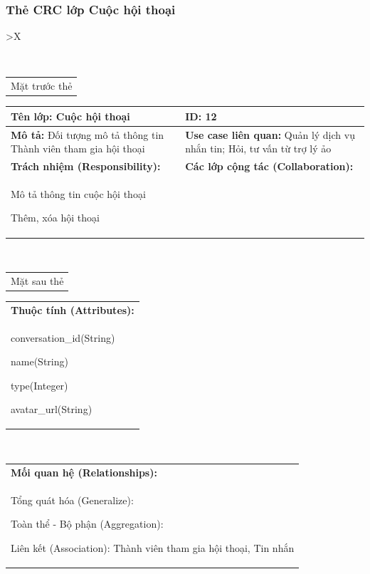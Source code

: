   \subsubsection{Thẻ CRC lớp Cuộc hội thoại}
  \begin{xltabular}{\textwidth}{
    >{\centering\arraybackslash}X 
  }
  \caption{\bfseries \fontsize{12pt}{0pt}\selectfont Thẻ CRC lớp Cuộc hội thoại}
  \\
  \begin{tabularx}{0.9\textwidth}{X}
    Mặt trước thẻ
  \end{tabularx}
  \begin{tabularx}{0.9\textwidth}{|X|X|}
    \hline
    \textbf{Tên lớp:} Cuộc hội thoại & \textbf{ID:} 12 \\
    \hline
    \textbf{Mô tả:} Đối tượng mô tả thông tin Thành viên tham gia hội thoại & \textbf{Use case liên quan:} Quản lý dịch vụ nhắn tin; Hỏi, tư vấn từ trợ lý ảo \\
    \hline
    \textbf{Trách nhiệm (Responsibility):} & \textbf{Các lớp cộng tác (Collaboration):} \\
    Mô tả thông tin cuộc hội thoại

    Thêm, xóa hội thoại
    & 

    \\
    \hline
  \end{tabularx}
  \\ 
  \begin{tabularx}{0.9\textwidth}{X}
    Mặt sau thẻ
  \end{tabularx} 
  \begin{tabularx}{0.9\textwidth}{|X|}
    \hline
    \textbf{Thuộc tính (Attributes):} \\
    conversation\_id(String) 
    
    name(String)

    type(Integer)

    avatar\_url(String)
    \\
    \hline
  \end{tabularx}
  \\     
  \begin{tabularx}{0.9\textwidth}{|X|}
    \textbf{Mối quan hệ (Relationships):} \\
    Tổng quát hóa (Generalize):  

    Toàn thể - Bộ phận (Aggregation): 
    
    Liên kết (Association): Thành viên tham gia hội thoại, Tin nhắn 
    \\
    \hline
  \end{tabularx}
  \end{xltabular}

